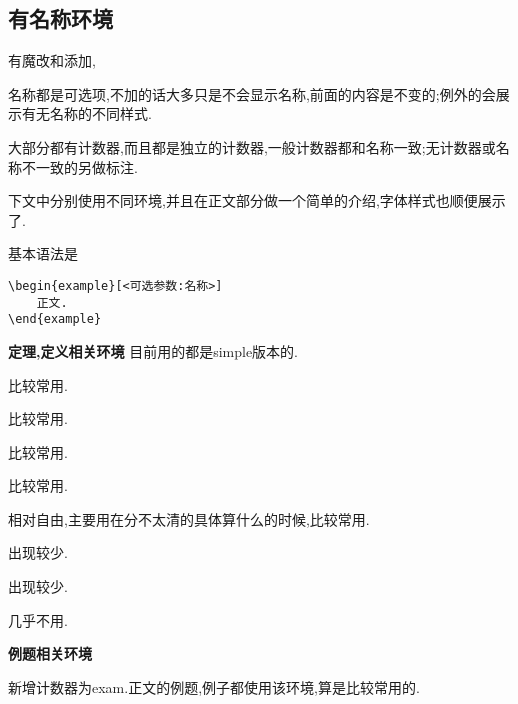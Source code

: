 \documentclass[lang=cn,12pt,scheme=chinese,mode=simple,black]{elegantbook}
\begin{document}
\subsection{有名称环境}
有魔改和添加,

名称都是可选项,不加的话大多只是不会显示名称,前面的内容是不变的;例外的会展示有无名称的不同样式.

大部分都有计数器,而且都是独立的计数器,一般计数器都和名称一致;无计数器或名称不一致的另做标注.

下文中分别使用不同环境,并且在正文部分做一个简单的介绍,字体样式也顺便展示了.

基本语法是
\setcounter{chapter}{1}
\begin{lstlisting}
\begin{example}[<可选参数:名称>]
    正文.
\end{example}
\end{lstlisting}


\textbf{定理,定义相关环境}
目前用的都是simple版本的.

\begin{theorem}[theorem环境]
    比较常用.
\end{theorem}
\begin{definition}[definition环境]
    比较常用.
\end{definition}

\begin{lemma}[lemma环境]
    比较常用.
\end{lemma}

\begin{corollary}[corollary环境]
    比较常用.
\end{corollary}
\begin{proposition}[proposition环境]
    相对自由,主要用在分不太清的具体算什么的时候,比较常用.
\end{proposition}


\begin{notation}[notation环境]
    出现较少.
\end{notation}
\begin{axiom}[axiom环境]
    出现较少.
\end{axiom}

\begin{postulate}[postulate环境]
    几乎不用.
\end{postulate}


\textbf{例题相关环境}


\begin{example}[example环境]
    新增计数器为exam.正文的例题,例子都使用该环境,算是比较常用的.
\end{example}
\end{document}
